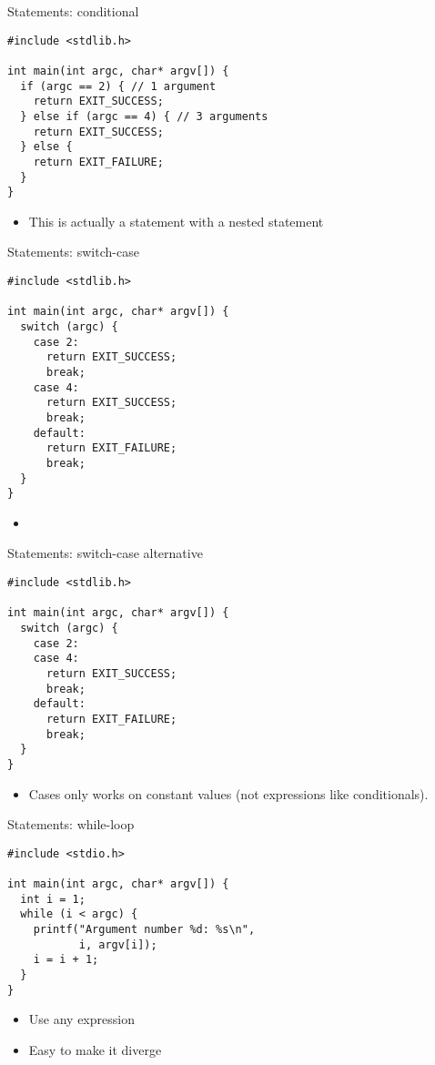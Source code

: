 \documentclass{beamer}
\begin{document}
\begin{frame}[fragile]{Statements: conditional}
\begin{lstlisting}[frame=single]
#include <stdlib.h>

int main(int argc, char* argv[]) {
  if (argc == 2) { // 1 argument
    return EXIT_SUCCESS;
  } else if (argc == 4) { // 3 arguments
    return EXIT_SUCCESS;
  } else {
    return EXIT_FAILURE;
  }
}
\end{lstlisting}
\begin{itemize}
\item This is actually a statement with a nested statement
\end{itemize}
\end{frame}

\begin{frame}[fragile]{Statements: switch-case}
\begin{lstlisting}[frame=single]
#include <stdlib.h>

int main(int argc, char* argv[]) {
  switch (argc) {
    case 2:
      return EXIT_SUCCESS;
      break;
    case 4:
      return EXIT_SUCCESS;
      break;
    default:
      return EXIT_FAILURE;
      break;
  }
}
\end{lstlisting}
\begin{itemize}
\item
\end{itemize}
\end{frame}

\begin{frame}[fragile]{Statements: switch-case alternative}
\begin{lstlisting}[frame=single]
#include <stdlib.h>

int main(int argc, char* argv[]) {
  switch (argc) {
    case 2:
    case 4:
      return EXIT_SUCCESS;
      break;
    default:
      return EXIT_FAILURE;
      break;
  }
}
\end{lstlisting}
\begin{itemize}
\item Cases only works on constant values (not expressions like conditionals).
\end{itemize}
\end{frame}


\begin{frame}[fragile]{Statements: while-loop}
\begin{lstlisting}[frame=single]
#include <stdio.h>

int main(int argc, char* argv[]) {
  int i = 1;
  while (i < argc) {
    printf("Argument number %d: %s\n",
           i, argv[i]);
    i = i + 1;
  }
}
\end{lstlisting}
\begin{itemize}
\item Use any expression
\item Easy to make it diverge
\end{itemize}
\end{frame}
\end{document}

